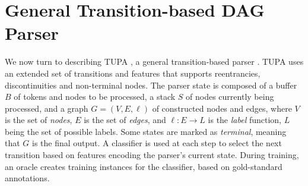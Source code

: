 \documentclass[11pt,a4paper]{article}
\begin{document}
\section{General Transition-based DAG Parser}\label{sec:model}

We now turn to describing TUPA \cite{hershcovich2017a,hershcovich2018multitask},
a general transition-based parser \cite{Nivre03anefficient}.
TUPA uses an extended set of transitions and features that supports
reentrancies, discontinuities and non-terminal nodes.
The parser state is composed of a buffer $B$ of tokens and nodes to be processed,
a stack $S$ of nodes currently being processed,
and a graph $G=(V,E,\ell)$ of constructed nodes and edges,
where $V$ is the set of \emph{nodes}, $E$ is the set of \emph{edges},
and $\ell : E \to L$ is the \emph{label} function, $L$ being the set of possible labels.
Some states are marked as \textit{terminal}, meaning that $G$ is the final output.
A classifier is used at each step to select the next transition based on features
encoding the parser's current state.
During training, an oracle creates training instances for the classifier,
based on gold-standard annotations.
\end{document}
